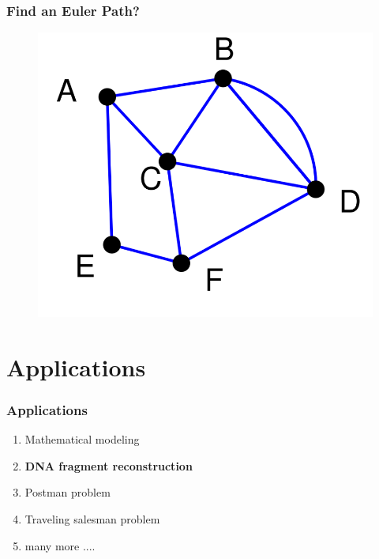\documentclass{beamer}
\begin{document}
\begin{frame}
\frametitle{Find an Euler Path?}
\begin{figure}[h]
\includegraphics[scale = 0.4]{path2.png}
\end{figure}
\end{frame}




\section{Applications}


\begin{frame}
\frametitle{Applications}
\begin{enumerate}
\item Mathematical modeling
\item {\color{red}\textbf{DNA fragment reconstruction}}
\item Postman problem
\item Traveling salesman problem

\item many more ....
\end{enumerate}
\end{frame}
\end{document}
